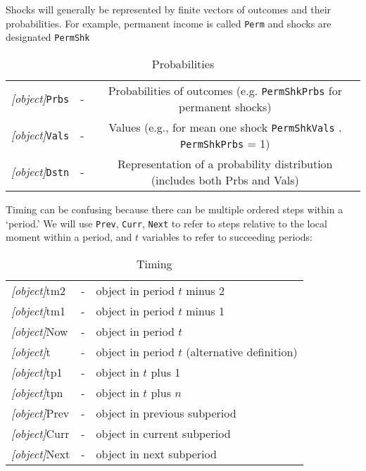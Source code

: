 \documentclass[12pt]{econtex}
\begin{document}
Shocks will generally be represented by finite vectors of outcomes and their probabilities.  For example, permanent income is called \texttt{Perm} and shocks are designated \texttt{PermShk}
\begin{table}[ht]
	\centering
	\begin{tabular}{|>{\ttfamily}ccc|} 		
		\hline
   \textit{[object]}\texttt{Prbs} & - & Probabilities of outcomes (e.g. \texttt{PermShkPrbs} for permanent shocks) 
\\ \textit{[object]}\texttt{Vals} & - & Values (e.g., for mean one shock \texttt{PermShkVals} . \texttt{PermShkPrbs} = 1) 
\\ \textit{[object]}\texttt{Dstn} & - & Representation of a probability distribution (includes both Prbs and Vals)
\\ 	\hline
	\end{tabular}
	\caption{Probabilities}
	\label{table:Probabilities}
\end{table}	



Timing can be confusing because there can be multiple ordered steps 
within a `period.'  We will use \texttt{Prev}, \texttt{Curr}, \texttt{Next} to refer
to steps relative to the local moment within a period, and $t$ variables to refer to succeeding periods:
\begin{table}[h]
	\centering 
	\begin{tabular}{|>{\ttfamily}lcl|} 		
		\hline
   \textit{[object]}tm2 & - & object in period $t$ minus 2 
\\ \textit{[object]}tm1 & - & object in period $t$ minus 1 
\\ \textit{[object]}Now & - & object in period $t$
\\ \textit{[object]}t\phantom{p1}   & - & object in period $t$ (alternative definition)
\\ \textit{[object]}tp1 & - & object in $t$ plus 1 
\\ \textit{[object]}tpn & - & object in $t$ plus $n$ 
\\ \textit{[object]}Prev & - & object in previous subperiod
\\ \textit{[object]}Curr & - & object in current subperiod
\\ \textit{[object]}Next & - & object in next subperiod
\\	\hline
	\end{tabular}
	\caption{Timing}
	\label{table:Timing}
\end{table}	


\end{document}
